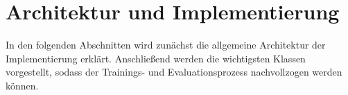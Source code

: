\chapter{Architektur und Implementierung}
In den folgenden Abschnitten wird zunächst die allgemeine Architektur der Implementierung erklärt. Anschließend werden die wichtigsten Klassen vorgestellt, sodass der Trainings- und Evaluationsprozess nachvollzogen werden können.




